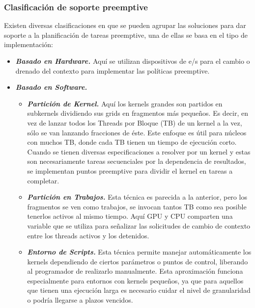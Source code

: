 \subsubsection{Clasificación de soporte preemptive}

\label{claspree}
Existen diversas clasificaciones en que se pueden agrupar las soluciones para dar soporte a la planificación de tareas preemptive, una de ellas se basa en el tipo de implementación:

\begin{itemize}
\item \textbf{\textit{Basado en Hardware.}} 
	Aquí se utilizan dispositivos de e/s para el cambio o drenado del contexto para implementar las políticas preemptive. 	

\item \textbf{\textit{Basado en Software.}}
	\begin{itemize}
	\item \textbf{\textit{Partición de Kernel.}}
		Aquí los kernels grandes son partidos en subkernels dividiendo sus grids en fragmentos más pequeños. Es decir, en vez de lanzar todos los Threads por Bloque (TB) de un kernel a la vez, sólo se van lanzando fracciones de éste. Este enfoque es útil para núcleos con muchos TB, donde cada TB tienen un tiempo de ejecución corto. Cuando se tienen diversas especificaciones a resolver por un kernel y estas son necesariamente tareas secuenciales por la dependencia de resultados, se implementan puntos preemptive para dividir el kernel en tareas a completar.  
	
	\item \textbf{\textit{Partición en Trabajos.}}
		Esta técnica es parecida a la anterior, pero los fragmentos se ven como trabajos, se invocan tantos TB como sea posible tenerlos activos al mismo tiempo. Aquí GPU y CPU comparten una variable que se utiliza para señalizar las solicitudes de cambio de contexto entre los threads activos y los detenidos.

	\item \textbf{\textit{Entorno de Scripts.}}	
		Esta técnica permite manejar automáticamente los kernels dependiendo de ciertos parámetros o puntos de control, liberando al programador de realizarlo manualmente. Esta aproximación funciona especialmente para entornos con kernels pequeños, ya que para aquellos que tienen una ejecución larga es necesario cuidar el nivel de granularidad o podría llegarse a plazos vencidos.
		

\end{itemize}
\end{itemize}
